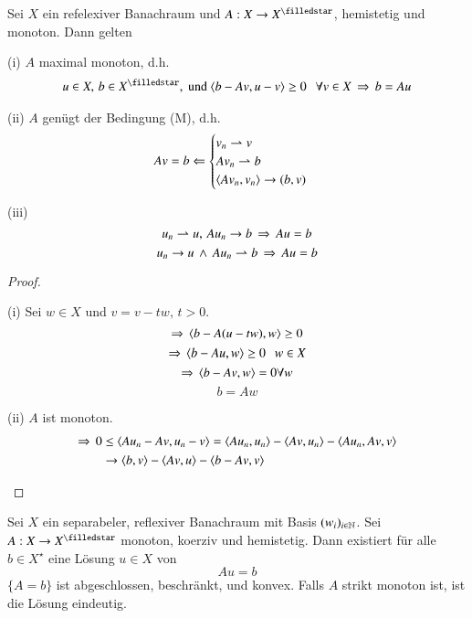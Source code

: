 \begin{lem}[Minty]\label{4.5}
    Sei $X$ ein refelexiver Banachraum und $A:X\ra X^\star$, hemistetig und monoton. Dann gelten
    \begin{description}
        \item{(i)}
        $A$ maximal monoton, d.h.
        \begin{align*}
            u\in X, \, b\in X^\star, \text{ und } \lal b-Av,u-v\ral\geq 0 \qq \forall v\in X\, \Ra \,b=Au
        \end{align*}
        \item{(ii)}
        $A$ genügt der Bedingung (M), d.h.
        \begin{align}\label{15}
            Av=b \Leftarrow \begin{cases} v_n \rightharpoonup v \\ Av_n\rightharpoonup b \\ \langle Av_n,v_n\rangle
            \rightarrow (b,v)
        \end{cases}
        \end{align}
        \item{(iii)}
        \[
            u_n \rightharpoonup u, \, Au_n\rightarrow b \, \Rightarrow \, Au=b
        \]
        \[
            u_n\rightarrow u \,\wedge \, Au_n \rightharpoonup b \, \Rightarrow \, Au=b
        \]
    \end{description}
\end{lem}

\begin{proof}
    \begin{description}
    \item{(i)}
    Sei $w\in X$ und $v=v-tw, \, t>0$.
    \[
        \Rightarrow \,\langle b-A(u-tw),w\rangle\geq 0
    \]
    \[
        \Rightarrow\,\langle b-Au, w\rangle\geq 0 \hspace{.25cm} w\in X
    \]
    \[
        \Rightarrow \,\langle b-Av,w\rangle=0 \forall w
    \]
    \[
        b=Aw
    \]
    \item{(ii)}
    $A$ ist monoton.
    \begin{align*}
    \Rightarrow \, 0&\leq \langle Au_n-Av,u_n-v\rangle = \langle Au_n,u_n\rangle-\langle Av,u_n\rangle - \langle Au_n,Av,v\rangle\\
    &\rightarrow \langle b,v\rangle-\langle Av,u\rangle-\langle b-Av,v\rangle
    \end{align*}
    \end{description}
\end{proof}

\begin{theorem}\label{4.6}
    Sei $X$ ein separabeler, reflexiver Banachraum mit Basis $(w_i)_{i\in \mathbb{N}}$. Sei $A:X\ra X^\star$
    monoton, koerziv und hemistetig. Dann existiert für alle $b\in X^\star$ eine Lösung $u\in X$ von
    \[ Au=b \]
    $\{A=b\}$ ist abgeschlossen, beschränkt, und konvex. Falls $A$ strikt monoton ist, ist die Lösung
    eindeutig.
\end{theorem}

